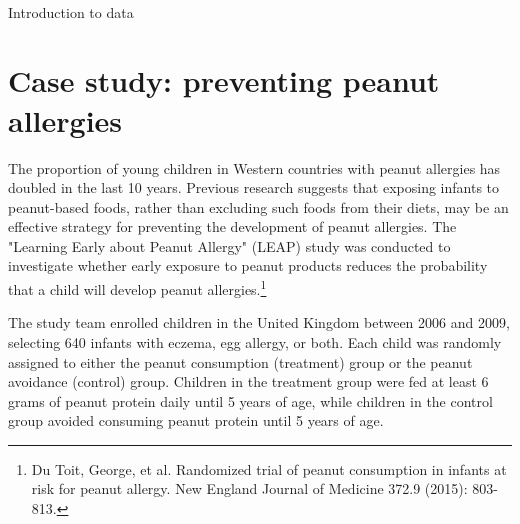 \ \textD{\newpage}

\begin{chapterpage}{Introduction to data}
  \label{introductionToData}
\end{chapterpage}
\renewcommand{\chapterfolder}{ch_intro_to_data}



\section[Case study]{Case study: preventing peanut allergies}
\label{leapCaseStudy}


The proportion of young children in Western countries with peanut allergies has doubled in the last 10 years. Previous research suggests that exposing infants to peanut-based foods, rather than excluding such foods from their diets, may be an effective strategy for preventing the development of peanut allergies. The "Learning Early about Peanut Allergy" (LEAP) study was conducted to investigate whether early exposure to peanut products reduces the probability that a child will develop peanut allergies.\footnote{Du Toit, George, et al. Randomized trial of peanut consumption in infants at risk for peanut allergy. New England Journal of Medicine 372.9 (2015): 803-813.}

The study team enrolled children in the United Kingdom between 2006 and 2009, selecting 640 infants with eczema, egg allergy, or both. Each child was randomly assigned to either the peanut consumption (treatment) group or the peanut avoidance (control) group. Children in the treatment group were fed at least 6 grams of peanut protein daily until 5 years of age, while children in the control group avoided consuming peanut protein until 5 years of age.

